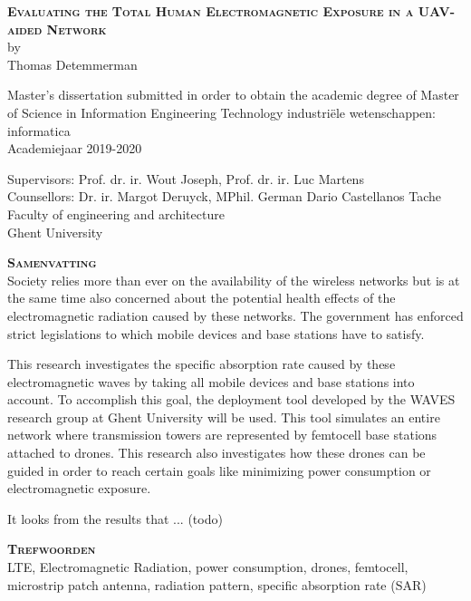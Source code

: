 \begin{center}
\textsc{\textbf{\Huge Evaluating the Total Human Electromagnetic Exposure in a UAV-aided Network}}\\

by\\
Thomas Detemmerman

Master's dissertation submitted in order to obtain the academic degree of Master of Science in Information Engineering Technology
industri\"ele wetenschappen: informatica\\
Academiejaar 2019-2020

Supervisors: Prof. dr. ir. Wout Joseph, Prof. dr. ir. Luc Martens\\
Counsellors: Dr. ir. Margot Deruyck, MPhil. German Dario Castellanos Tache\\
Faculty of engineering and architecture\\
Ghent University
\end{center}

\textsc{\textbf{\LARGE Samenvatting}}\\

Society relies more than ever on the availability of the wireless networks but is at the same time also 
concerned about the potential health effects of the electromagnetic radiation caused by these networks.
The government has enforced strict legislations to which mobile devices and base stations have to satisfy.

This research investigates the specific absorption rate caused by these electromagnetic waves by taking all mobile devices and base stations into account.
To accomplish this goal, the deployment tool developed by the WAVES research group at Ghent University will be used. This tool simulates an entire network 
where transmission towers are represented by femtocell base stations attached to drones. This research also investigates how these drones can be guided 
in order to reach certain goals like minimizing power consumption or electromagnetic exposure.

It looks from the results that ... (todo)



\textsc{\textbf{\LARGE Trefwoorden}}\\

LTE, Electromagnetic Radiation, power consumption, drones, femtocell, microstrip patch antenna, radiation pattern, specific absorption rate (SAR)

